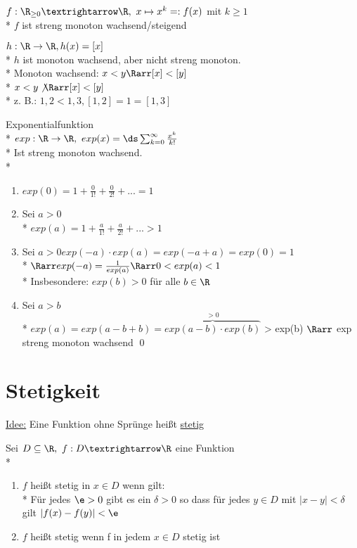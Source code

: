 \begin{enumerate}
\item{$f:\R_{\geq 0}→\R,\ x\mapsto x^k =:f(x)$ mit $k\geq 1$\\*
$f$ ist streng monoton wachsend/steigend 
\item{$h: \R \to \R, h(x) = [x]$}\\*
$h$ ist monoton wachsend, aber nicht streng monoton.\\*
Monoton wachsend: $x < y \Rarr [x] < [y]$\\*
$x < y \not\Rarr [x] < [y]$\\*
z. B.: $1,2 < 1,3 , [1,2] = 1 = [1,3] $}
\item{Exponentialfunktion\\*
$exp: \R \to \R,\ exp(x)= \ds\sum_{k=0}^{\infty} \frac{x^k}{k!}$\\*
Ist streng monoton wachsend.\\*
\bew
\begin{enumerate}
\item{$exp(0) = 1 + \frac{0}{1!} + \frac{0}{2!} + ... = 1$}
\item{Sei $a > 0$\\*
$exp(a) = 1 + \frac{a}{1!} + \frac{a}{2!} + ... > 1$}
\item{Sei $a > 0 exp(-a) \cdot exp(a) = exp(-a + a) = exp(0) = 1$\\*
$\Rarr exp(-a) = \frac{1}{exp(a)} \Rarr 0 < exp(a) < 1$\\*
Insbesondere: $exp(b) > 0$ für alle $b \in \R$}
\item{Sei $a > b$\\*
$exp(a) = exp(a - b + b) = \overbrace{exp(a - b) \cdot exp(b)}^{>0}$
> exp(b) $\Rarr$ exp streng monoton wachsend \qed }
\end{enumerate}
}
\end{enumerate}

\chapter{Stetigkeit}
\ul{Idee:} Eine Funktion ohne Sprünge heißt \ul{stetig}

Sei $D\subseteq \R,\ f:D→\R$ eine Funktion\\*
\begin{enumerate}
\item{$f$ heißt stetig in $x\in D$ wenn gilt:\\*
Für jedes $\e>0$ gibt es ein $\delta>0$ so dass für jedes $y\in D$ mit $|x-y|<\delta$ gilt $|f(x)-f(y)|<\e$ %
}
\item{$f$ heißt stetig wenn f in jedem $x\in D$ stetig ist}
\end{enumerate}

